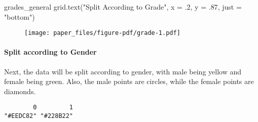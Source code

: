 \documentclass[
]{apa7}
\let\oldparagraph\paragraph
\renewcommand{\paragraph}[1]{\oldparagraph{#1}\mbox{}}
\newenvironment{Shaded}{\begin{snugshade}}{\end{snugshade}}
\newcommand{\AttributeTok}[1]{\textcolor[rgb]{0.40,0.45,0.13}{#1}}
\newcommand{\CommentTok}[1]{\textcolor[rgb]{0.37,0.37,0.37}{#1}}
\newcommand{\DecValTok}[1]{\textcolor[rgb]{0.68,0.00,0.00}{#1}}
\newcommand{\FunctionTok}[1]{\textcolor[rgb]{0.28,0.35,0.67}{#1}}
\newcommand{\NormalTok}[1]{\textcolor[rgb]{0.00,0.23,0.31}{#1}}
\newcommand{\OtherTok}[1]{\textcolor[rgb]{0.00,0.23,0.31}{#1}}
\newcommand{\SpecialCharTok}[1]{\textcolor[rgb]{0.37,0.37,0.37}{#1}}
\newcommand{\StringTok}[1]{\textcolor[rgb]{0.13,0.47,0.30}{#1}}
\begin{document}
\begin{Shaded}
\begin{Highlighting}[]
\NormalTok{grades\_general}
\FunctionTok{grid.text}\NormalTok{(}\StringTok{"Split According to Grade"}\NormalTok{, }\AttributeTok{x =}\NormalTok{ .}\DecValTok{2}\NormalTok{, }\AttributeTok{y =}\NormalTok{ .}\DecValTok{87}\NormalTok{, }\AttributeTok{just =} \StringTok{"bottom"}\NormalTok{) }
\end{Highlighting}
\end{Shaded}

\begin{figure}[H]

{\centering \texttt{[image: paper\_files/figure-pdf/grade-1.pdf]}

}

\end{figure}

\hypertarget{split-according-to-gender}{%
\paragraph{Split according to Gender}\label{split-according-to-gender}}

Next, the data will be split according to gender, with male being yellow
and female being green. Also, the male points are circles, while the
female points are diamonds.

\begin{Shaded}
\end{Shaded}

\begin{verbatim}
        0         1 
"#EEDC82" "#228B22" 
\end{verbatim}
\end{document}
